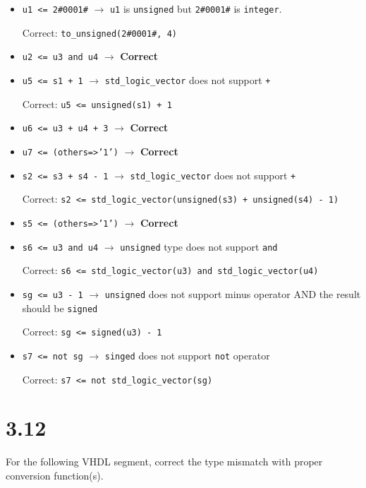 \documentclass[dvipsnames, svgnames, x11names, a4paper,12pt]{article}
\begin{document}
\begin{itemize}
    \item \texttt{u1 <= 2\#0001\#} $\rightarrow$  \texttt{u1} is \texttt{unsigned} but \texttt{2\#0001\#} is \texttt{integer}.
    
    Correct: \texttt{to\_unsigned(2\#0001\#, 4)}
    
    \item \texttt{u2 <= u3 and u4} $\rightarrow$ \textbf{Correct}
    
    \item \texttt{u5 <= s1 + 1}  $\rightarrow$ \texttt{std\_logic\_vector} does not support \texttt{+}
     
     Correct: \texttt{u5 <= unsigned(s1) + 1}
     
    \item \texttt{u6 <= u3 + u4 + 3} $\rightarrow$ \textbf{Correct}
    
    \item \texttt{u7 <= (others=>'1')} $\rightarrow$ \textbf{Correct}
    
    \item \texttt{s2 <= s3 + s4 - 1} $\rightarrow$ \texttt{std\_logic\_vector} does not support \texttt{+}
    
    Correct: \texttt{s2 <= std\_logic\_vector(unsigned(s3) + unsigned(s4) - 1)}
    
    \item \texttt{s5 <= (others=>'1')} $\rightarrow$ \textbf{Correct}
    
    \item \texttt{s6 <= u3 and u4} $\rightarrow$ \texttt{unsigned} type does not support \texttt{and}
    
    Correct: \texttt{s6 <= std\_logic\_vector(u3) and std\_logic\_vector(u4)}
    
    \item \texttt{sg <= u3 - 1} $\rightarrow$ \texttt{unsigned} does not support minus operator AND the result should be \texttt{signed}
     
     Correct: \texttt{sg <= signed(u3) - 1}
     
    \item \texttt{s7 <= not sg} $\rightarrow$ \texttt{singed} does not support \texttt{not} operator
    
    Correct: \texttt{s7 <= not std\_logic\_vector(sg)}
\end{itemize}
\section{3.12} 
For the following VHDL segment, correct the type mismatch with proper conversion
function(s).
\end{document}
